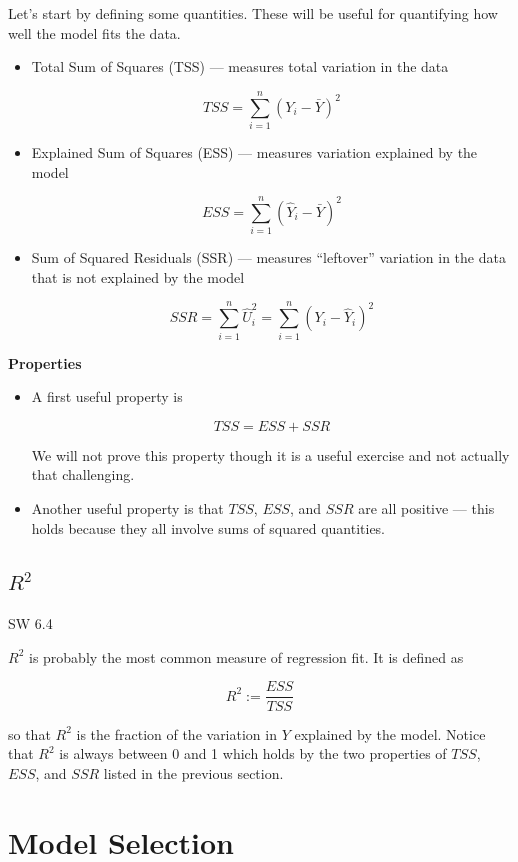 \documentclass[
  letterpaper,
  DIV=11,
  numbers=noendperiod]{scrreprt}
\begin{document}
Let's start by defining some quantities. These will be useful for
quantifying how well the model fits the data.

\begin{itemize}
\item
  Total Sum of Squares (TSS) --- measures total variation in the data

  \[
      TSS = \sum_{i=1}^n (Y_i - \bar{Y})^2
    \]
\item
  Explained Sum of Squares (ESS) --- measures variation explained by the
  model

  \[
      ESS = \sum_{i=1}^n (\hat{Y}_i - \bar{Y})^2
    \]
\item
  Sum of Squared Residuals (SSR) --- measures ``leftover'' variation in
  the data that is not explained by the model

  \[
      SSR = \sum_{i=1}^n \hat{U}_i^2 = \sum_{i=1}^n (Y_i - \hat{Y}_i)^2
    \]
\end{itemize}

\textbf{Properties}

\begin{itemize}
\item
  A first useful property is

  \[
      TSS = ESS + SSR
    \]

  We will not prove this property though it is a useful exercise and not
  actually that challenging.
\item
  Another useful property is that \(TSS\), \(ESS\), and \(SSR\) are all
  positive --- this holds because they all involve sums of squared
  quantities.
\end{itemize}

\subsection{\texorpdfstring{\(R^2\)}{R\^{}2}}\label{r2}

SW 6.4

\(R^2\) is probably the most common measure of regression fit. It is
defined as

\[
  R^2 := \frac{ESS}{TSS}
\]

so that \(R^2\) is the fraction of the variation in \(Y\) explained by
the model. Notice that \(R^2\) is always between 0 and 1 which holds by
the two properties of \(TSS\), \(ESS\), and \(SSR\) listed in the
previous section.

\section{Model Selection}\label{model-selection}
\end{document}
